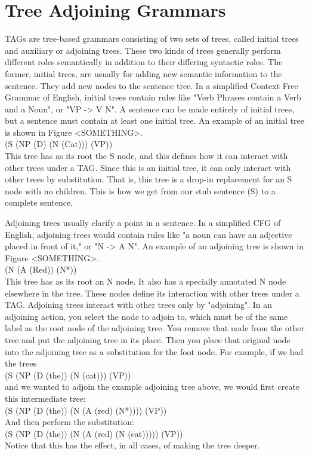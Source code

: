 \section{Tree Adjoining Grammars}

TAGs are tree-based grammars consisting of two sets of trees, called initial
trees and auxiliary or adjoining trees.  These two kinds of trees generally perform
different roles semantically in addition to their differing syntactic roles.  The former,
initial trees, are usually for adding new semantic information to the sentence.  They
add new nodes to the sentence tree.  In a simplified Context Free Grammar of English,
initial trees contain rules like "Verb Phrases contain a Verb and a Noun", or "VP -> V N".
A sentence can be made entirely of initial trees, but a sentence must contain at least
one initial tree.  An example of an initial tree is shown in Figure <SOMETHING>.\\
(S (NP (D) (N (Cat))) (VP))\\
This tree has as its root the S node, and this defines how it can interact with other
trees under a TAG.  Since this is an initial tree, it can only interact with other trees by
substitution.  That is, this tree is a drop-in replacement for an S node with no children.
This is how we get from our stub sentence (S) to a complete sentence.

Adjoining trees usually clarify a point in a sentence.  In a simplified CFG of English, adjoining
trees would contain rules like "a noun can have an adjective placed in front of it," or "N -> A N".
An example of an adjoining tree is shown in Figure <SOMETHING>.\\
(N (A (Red)) (N*))\\
This tree has as its root an N node.  It also has a specially annotated N node elsewhere in the
tree.  These nodes define its interaction with other trees under a TAG.  Adjoining trees interact
with other trees only by "adjoining".  In an adjoining action, you select the node
to adjoin to, which must be of the same label as the root node of the adjoining tree.  You remove
that node from the other tree and put the adjoining tree in its place.  Then
you place that original node into the adjoining tree as a substitution for the foot node.
For example, if we had the trees\\
(S (NP (D (the)) (N (cat))) (VP))\\
and we wanted to adjoin the example adjoining tree above, we would first create this intermediate tree:\\
(S (NP (D (the)) (N (A (red) (N*)))) (VP))\\
And then perform the substitution:\\
(S (NP (D (the)) (N (A (red) (N (cat))))) (VP))\\
Notice that this has the effect, in all cases, of making the tree deeper.

